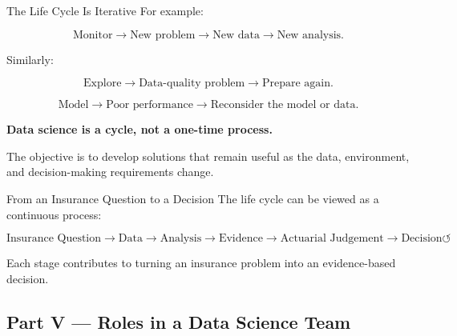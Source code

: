 \documentclass[
  ignorenonframetext,
  aspectratio=169,
]{beamer}
\begin{document}
\begin{frame}{The Life Cycle Is Iterative}
\protect{}\label{the-life-cycle-is-iterative}
For example:

\[
\text{Monitor}
\rightarrow
\text{New problem}
\rightarrow
\text{New data}
\rightarrow
\text{New analysis}.
\]

Similarly:

\[
\text{Explore}
\rightarrow
\text{Data-quality problem}
\rightarrow
\text{Prepare again}.
\]

\[
\text{Model}
\rightarrow
\text{Poor performance}
\rightarrow
\text{Reconsider the model or data}.
\]

\begin{tcolorbox}[enhanced jigsaw, arc=.35mm, bottomrule=.15mm, bottomtitle=1mm, breakable, colback=white, colbacktitle=quarto-callout-note-color!10!white, colframe=quarto-callout-note-color-frame, coltitle=black, left=2mm, leftrule=.75mm, opacityback=0, opacitybacktitle=0.6, rightrule=.15mm, title=\textcolor{quarto-callout-note-color}{\faInfo}\hspace{0.5em}{Key idea}, titlerule=0mm, toprule=.15mm, toptitle=1mm]

\textbf{Data science is a cycle, not a one-time process.}

The objective is to develop solutions that remain useful as the data,
environment, and decision-making requirements change.

\end{tcolorbox}
\end{frame}

\begin{frame}{From an Insurance Question to a Decision}
\protect{}\label{from-an-insurance-question-to-a-decision}
The life cycle can be viewed as a continuous process:

\[
\boxed{
\text{Insurance Question}
\rightarrow
\text{Data}
\rightarrow
\text{Analysis}
\rightarrow
\text{Evidence}
\rightarrow
\text{Actuarial Judgement}
\rightarrow
\text{Decision}
\circlearrowleft
}
\]

Each stage contributes to turning an insurance problem into an
evidence-based decision.
\end{frame}

\subsection{Part V --- Roles in a Data Science
Team}\label{part-v-roles-in-a-data-science-team}
\end{document}
